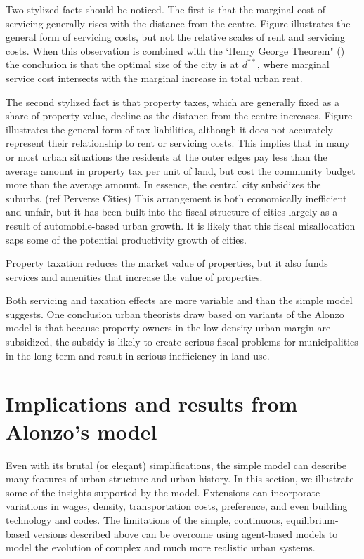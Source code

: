 Two stylized facts should be noticed. The first is that the marginal cost of servicing generally  rises with the distance from the centre.  Figure
illustrates the general form of servicing costs, but not  the relative scales of rent and servicing costs. When this observation is combined with the `Henry George Theorem" () the conclusion is that the optimal size of the city  is at  $d^{**}$, where marginal service cost intersects with the marginal increase in total urban rent. 

The second stylized fact  is that property taxes, which are generally  fixed as a share of property value, decline as the distance from the centre increases. Figure %
illustrates the general form of tax liabilities, although it does not  accurately represent their relationship to rent or  servicing costs.  This implies that in many or most urban situations the residents at the outer edges pay less than the average amount in property tax per unit of land, but cost  the community budget more than the average amount. In essence, the central city subsidizes the suburbs. (ref Perverse Cities)
This arrangement is both economically inefficient and unfair, but it has been built into the fiscal structure of cities largely as a result of automobile-based urban growth. It is likely that this fiscal misallocation saps some of the potential productivity growth of cities.

Property taxation reduces the market value of properties, but it also funds services and amenities that increase the value of properties. 

Both servicing and taxation effects are more variable and than the simple model suggests.  One  conclusion urban theorists draw based on variants of the Alonzo model is that because property owners in the low-density urban margin are subsidized,  the subsidy is likely to create serious fiscal problems for municipalities in the long term and result in serious inefficiency in land use. 

\section{Implications and results from Alonzo's  model}
Even with its brutal (or elegant) simplifications, the simple model  can  describe  many features of urban structure and urban history. In this section, we illustrate some of the insights supported by the model. Extensions can incorporate variations in wages, density, transportation costs,  preference, and even building technology and codes. The limitations of the simple, continuous, equilibrium-based versions described above can be overcome using agent-based models to model the evolution of complex and much more realistic urban systems. 

